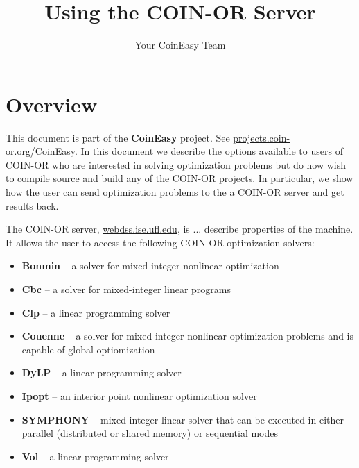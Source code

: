 \documentclass[11pt]{article}
\renewcommand{\{}{{\char"7B}}
\renewcommand{\}}{{\char"7D}}
\renewcommand{\^}{{\char"0D}}
\renewcommand{\'}{{\char"0D}}
\begin{document}
\title{Using the COIN-OR Server}
\vskip 2in
\author{Your CoinEasy Team}
\maketitle


\newpage

\section{Overview}\label{section:overview}


This document is part of the {\bf CoinEasy} project. See \url{projects.coin-or.org/CoinEasy}. In this document we describe the options available to users of COIN-OR who are interested in solving optimization problems but do now wish to compile source and build any of the COIN-OR projects. In particular, we show how the user can send optimization problems to the a COIN-OR server and get results back.

The COIN-OR server, \url{webdss.ise.ufl.edu},  is ... describe properties of the machine.  It allows the user to access the following COIN-OR optimization solvers:

\begin{itemize}
\item {\bf Bonmin} -- a solver for mixed-integer nonlinear optimization

\item {\bf Cbc} -- a solver for mixed-integer linear programs

\item {\bf Clp} -- a linear programming solver

 \item  {\bf Couenne} -- a solver for mixed-integer nonlinear optimization problems and is capable of global optiomization

 \item {\bf DyLP} -- a linear programming solver

 \item {\bf Ipopt} -- an interior point nonlinear optimization solver

 \item {\bf SYMPHONY} -- mixed integer linear solver that can be executed in either parallel (distributed or shared memory) or sequential modes

 \item {\bf Vol} -- a linear programming solver
\end{itemize}
\end{document}
